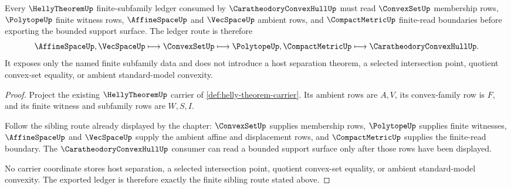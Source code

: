 \begin{theorem}
\label{thm:helly-theorem-finite-subfamily-ledger-route}
Every $\HellyTheoremUp$ finite-subfamily ledger consumed by $\CaratheodoryConvexHullUp$ must read $\ConvexSetUp$ membership rows, $\PolytopeUp$ finite witness rows, $\AffineSpaceUp$ and $\VecSpaceUp$ ambient rows, and $\CompactMetricUp$ finite-read boundaries before exporting the bounded support surface. The ledger route is therefore
$$
\AffineSpaceUp,\VecSpaceUp \longmapsto \ConvexSetUp \longmapsto \PolytopeUp,\CompactMetricUp \longmapsto \CaratheodoryConvexHullUp .
$$
It exposes only the named finite subfamily data and does not introduce a host separation theorem, a selected intersection point, quotient convex-set equality, or ambient standard-model convexity.
\end{theorem}
\begin{proof}
Project the existing $\HellyTheoremUp$ carrier of \autoref{def:helly-theorem-carrier}. Its ambient rows are $A,V$, its convex-family row is $F$, and its finite witness and subfamily rows are $W,S,I$.

Follow the sibling route already displayed by the chapter: $\ConvexSetUp$ supplies membership rows, $\PolytopeUp$ supplies finite witnesses, $\AffineSpaceUp$ and $\VecSpaceUp$ supply the ambient affine and displacement rows, and $\CompactMetricUp$ supplies the finite-read boundary. The $\CaratheodoryConvexHullUp$ consumer can read a bounded support surface only after those rows have been displayed.

No carrier coordinate stores host separation, a selected intersection point, quotient convex-set equality, or ambient standard-model convexity. The exported ledger is therefore exactly the finite sibling route stated above.
\end{proof}

